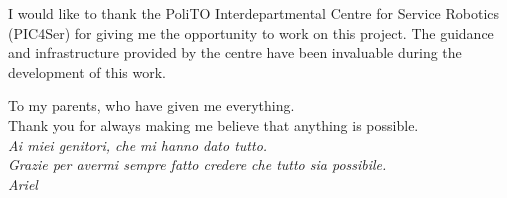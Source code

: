 
\ifprint \vspace*{10\baselineskip} \else
{I would like to thank the PoliTO Interdepartmental Centre for Service Robotics (PIC4Ser) for giving me the opportunity to work on this project. The guidance and infrastructure provided by the centre have been invaluable during the development of this work.
\vspace*{5\baselineskip}}
\fi

\begin{flushright}
    To my parents, who have given me everything.\\
    Thank you for always making me believe that anything is possible.\\
    \textit{{Ai miei genitori, che mi hanno dato tutto.\\ 
    Grazie per avermi sempre fatto credere che tutto sia possibile.}} \\[\baselineskip]
    \textit{Ariel}
\end{flushright}
